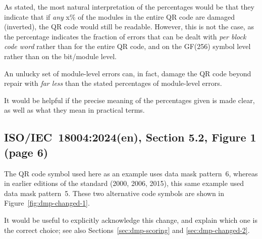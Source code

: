 \documentclass[a4paper,twoside]{article}
\newcommand{\shortstandard}{ISO/IEC~18004}
\newcommand{\standard}{\shortstandard:2024(en)}
\begin{document}
As stated, the most natural interpretation of the percentages would be that they indicate that if \emph{any} x\% of the
modules in the entire QR code are damaged (inverted), the QR code would still be readable. However, this is not the
case, as the percentage indicates the fraction of errors that can be dealt with \emph{per block code word} rather than for
the entire QR code, and on the GF(256) symbol level rather than on the bit/module level.

An unlucky set of module-level errors can, in fact, damage the QR code beyond repair with \emph{far less} than the stated
percentages of module-level errors.

It would be helpful if the precise meaning of the percentages given is made clear, as well as what they mean in practical
terms.

\subsection{\standard, Section 5.2, Figure 1 (page 6)}
\label{sec:dmp-changed-1}

The QR code symbol used here as an example uses data mask pattern~6, whereas in earlier editions of the standard
(2000, 2006, 2015), this same example used data mask pattern~5.
These two alternative code symbols are shown in Figure~\ref{fig:dmp-changed-1}.

It would be useful to explicitly acknowledge this change, and explain which one is the correct choice;
see also Sections~\ref{sec:dmp-scoring} and \ref{sec:dmp-changed-2}.
\end{document}
